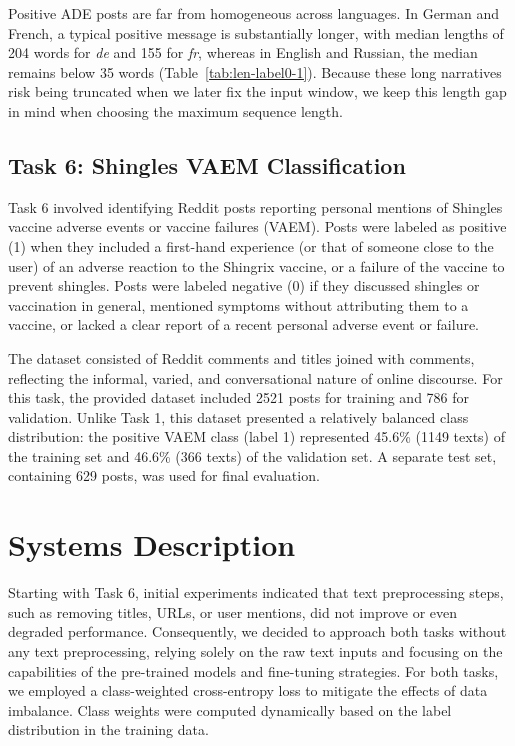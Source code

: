 \documentclass[letterpaper]{article} %
\begin{document}
Positive ADE posts are far from homogeneous across languages.  
In German and French, a typical positive message is substantially longer, with median lengths of 204 words for \textit{de} and 155 for \textit{fr}, whereas in English and Russian, the median remains below 35 words (Table~\ref{tab:len-label0-1}).  
Because these long narratives risk being truncated when we later fix the input window, we keep this length gap in mind when choosing the maximum sequence length.

\subsection{Task 6: Shingles VAEM Classification}

Task 6 involved identifying Reddit posts reporting personal mentions of Shingles vaccine adverse events or vaccine failures (VAEM).
Posts were labeled as positive (1) when they included a first-hand experience (or that of someone close to the user) of an adverse reaction to the Shingrix vaccine, or a failure of the vaccine to prevent shingles.
Posts were labeled negative (0) if they discussed shingles or vaccination in general, mentioned symptoms without attributing them to a vaccine, or lacked a clear report of a recent personal adverse event or failure.

The dataset consisted of Reddit comments and titles joined with comments, reflecting the informal, varied, and conversational nature of online discourse. For this task, the provided dataset included 2521 posts for training and 786 for validation. Unlike Task 1, this dataset presented a relatively balanced class distribution: the positive VAEM class (label 1) represented 45.6\% (1149 texts) of the training set and 46.6\% (366 texts) of the validation set. A separate test set, containing 629 posts, was used for final evaluation.


\section{Systems Description}

Starting with Task 6, initial experiments indicated that text preprocessing steps, such as removing titles, URLs, or user mentions, did not improve or even degraded performance.
Consequently, we decided to approach both tasks without any text preprocessing, relying solely on the raw text inputs and focusing on the capabilities of the pre-trained models and fine-tuning strategies.
For both tasks, we employed a class-weighted cross-entropy loss to mitigate the effects of data imbalance. Class weights were computed dynamically based on the label distribution in the training data.
\end{document}
